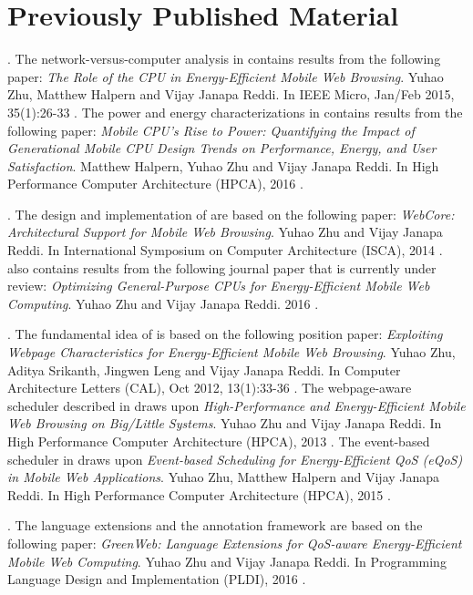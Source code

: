 \section{Previously Published Material}
\label{sec:intro:prev}


\textbf{}. The network-versus-computer analysis in  contains results from the following paper: \textit{The Role of the CPU in Energy-Efficient Mobile Web Browsing}. Yuhao Zhu, Matthew Halpern and Vijay Janapa Reddi. In IEEE Micro, Jan/Feb 2015, 35(1):26-33 \cite{zhu2015role}. The power and energy characterizations in  contains results from the following paper: \textit{Mobile CPU's Rise to Power: Quantifying the Impact of Generational Mobile CPU Design Trends on Performance, Energy, and User Satisfaction}. Matthew Halpern, Yuhao Zhu and Vijay Janapa Reddi. In High Performance Computer Architecture (HPCA), 2016 \cite{mobilecpu}.

\textbf{}. The design and implementation of \webcore are based on the following paper: \textit{WebCore: Architectural Support for Mobile Web Browsing}. Yuhao Zhu and Vijay Janapa Reddi. In International Symposium on Computer Architecture (ISCA), 2014 \cite{webcore}.  also contains results from the following journal paper that is currently under review: \textit{Optimizing General-Purpose CPUs for Energy-Efficient Mobile Web Computing}. Yuhao Zhu and Vijay Janapa Reddi. 2016 \cite{webcore-tocs}.

\textbf{}. The fundamental idea of \webrt is based on the following position paper:  \textit{Exploiting Webpage Characteristics for Energy-Efficient Mobile Web Browsing}. Yuhao Zhu, Aditya Srikanth, Jingwen Leng and Vijay Janapa Reddi. In Computer Architecture Letters (CAL), Oct 2012, 13(1):33-36 \cite{zhu2014exploiting}. The webpage-aware scheduler described in  draws upon \textit{High-Performance and Energy-Efficient Mobile Web Browsing on Big/Little Systems}. Yuhao Zhu and Vijay Janapa Reddi.  In High Performance Computer Architecture (HPCA), 2013 \cite{big-little}. The event-based scheduler in  draws upon \textit{Event-based Scheduling for Energy-Efficient QoS (eQoS) in Mobile Web Applications}. Yuhao Zhu, Matthew Halpern and Vijay Janapa Reddi. In High Performance Computer Architecture (HPCA), 2015 \cite{ebs}.

\textbf{}. The \greenweb language extensions and the \autogreen annotation framework are based on the following paper: \textit{GreenWeb: Language Extensions for QoS-aware Energy-Efficient Mobile Web Computing}. Yuhao Zhu and Vijay Janapa Reddi. In Programming Language Design and Implementation (PLDI), 2016 \cite{greenweb}.


